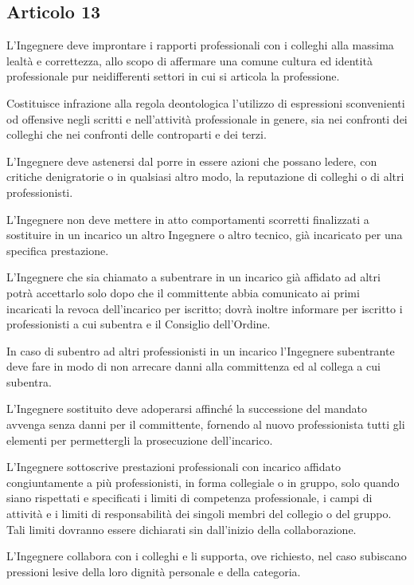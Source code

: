 \documentclass[letterpaper,10pt,italian]{sphinxmanual}
\begin{document}
\subsection{Articolo 13}
\label{\detokenize{capitoli/codice/codice_deontologico:articolo-13}}\begin{description}
\sphinxAtStartPar
L’Ingegnere deve improntare i rapporti professionali con i colleghi alla massima lealtà e correttezza, allo scopo di affermare una comune cultura ed identità professionale pur neidifferenti settori in cui si articola la professione.

\sphinxAtStartPar
Costituisce infrazione alla regola deontologica l’utilizzo di espressioni sconvenienti od offensive negli scritti e nell’attività professionale in genere, sia nei confronti dei colleghi che nei confronti delle controparti e dei terzi.

\sphinxAtStartPar
L’Ingegnere deve astenersi dal porre in essere azioni che possano ledere, con critiche denigratorie o in qualsiasi altro modo, la reputazione di colleghi o di altri professionisti.

\sphinxAtStartPar
L’Ingegnere non deve mettere in atto comportamenti scorretti finalizzati a sostituire in un incarico un altro Ingegnere o altro tecnico, già incaricato per una specifica prestazione.

\sphinxAtStartPar
L’Ingegnere che sia chiamato a subentrare in un incarico già affidato ad altri potrà accettarlo solo dopo che il committente abbia comunicato ai primi incaricati la revoca dell’incarico per iscritto; dovrà inoltre informare per iscritto i professionisti a cui subentra e il Consiglio dell’Ordine.

\sphinxAtStartPar
In caso di subentro ad altri professionisti in un incarico l’Ingegnere subentrante deve fare in modo di non arrecare danni alla committenza ed al collega a cui subentra.

\sphinxAtStartPar
L’Ingegnere sostituito deve adoperarsi affinché la successione del mandato avvenga senza danni per il committente, fornendo al nuovo professionista tutti gli elementi per permettergli la prosecuzione dell’incarico.

\sphinxAtStartPar
L’Ingegnere sottoscrive prestazioni professionali con incarico affidato congiuntamente a più professionisti, in forma collegiale o in gruppo, solo quando siano rispettati e specificati i limiti di competenza professionale, i campi di attività e i limiti di responsabilità dei singoli membri del collegio o del gruppo. Tali limiti dovranno essere dichiarati sin dall’inizio della collaborazione.

\sphinxAtStartPar
L’Ingegnere collabora con i colleghi e li supporta, ove richiesto, nel caso subiscano pressioni lesive della loro dignità personale e della categoria.

\end{description}
\end{document}
